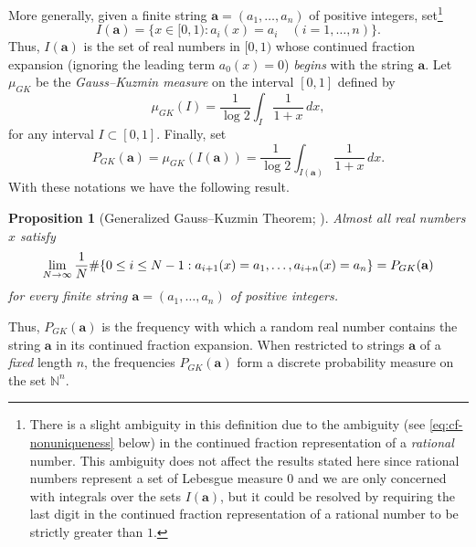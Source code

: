 \documentclass[10pt]{article}
\newtheorem{proposition}[lemma]{Proposition}
\theoremstyle{definition}
\newtheorem*{thmGKgeneralized}{Generalized Gauss--Kuzmin Theorem}
\numberwithin{equation}{section}
\numberwithin{lemma}{section}
\newcommand{\NN}{\mathbb{N}}
\newcommand{\bfa}{\mathbf{a}}
\begin{document}
More generally, given a finite string $\bfa=(a_1,\dots,a_n)$ of
positive integers, set\footnote{There is a slight ambiguity in this
definition due to the ambiguity (see
\eqref{eq:cf-nonuniqueness} below) in the continued fraction representation
of a \emph{rational} number. This ambiguity does not affect the 
results stated here 
since rational numbers represent a set of Lebesgue measure $0$
and we are only concerned with integrals over the sets $I(\bfa)$,  
but it could be resolved by requiring the last digit in the continued
fraction representation of a rational number to be strictly greater than
$1$.}
\begin{equation}
\label{eq:Ibfa-def}
I(\bfa)=\{x\in[0,1): a_i(x)=a_i\quad (i=1,\dots,n)\}.
\end{equation}
Thus, $I(\bfa)$ is the set of real numbers in $[0,1)$ 
whose continued fraction expansion (ignoring the leading term $a_0(x)=0$) 
\emph{begins} with the string $\bfa$.
Let $\mu_{GK}$ be the 
\emph{Gauss--Kuzmin measure} on the interval $[0,1]$ defined by
\begin{equation}
\label{eq:mugk-def}
\mu_{GK}(I)=\frac1{\log 2}\int_I \frac{1}{1+x}\,dx,
\end{equation}
for any interval $I\subset [0,1]$. Finally, set
\begin{equation} 
\label{eq:Pbfa-formula}
P_{GK}(\bfa)=\mu_{GK}(I(\bfa))=\frac1{\log
2}\int_{I(\bfa)}\frac1{1+x}\,dx.
\end{equation}
With these notations we have the following result.

\begin{proposition}
[Generalized Gauss--Kuzmin Theorem; 
{\cite[Proposition 4.1.2]{iosifescu-kraaikamp-book}}]
Almost all real numbers $x$ satisfy 
\begin{equation}
\notag
\lim_{N\to\infty}\frac1N\#\{0\le i\le N-1: 
a_{i+1}(x)=a_1,\dots,a_{i+n}(x)=a_n\} =P_{GK}(\bfa)
\end{equation}
for every finite string $\bfa=(a_1,\dots,a_n)$ of positive integers.
\end{proposition}

Thus, $P_{GK}(\bfa)$ is the frequency with which a random real
number contains the string $\bfa$ in its continued fraction expansion.
When restricted to strings $\bfa$ of a \emph{fixed} length $n$, the 
frequencies $P_{GK}(\bfa)$ form a discrete probability measure on the
set $\NN^n$.
\end{document}
